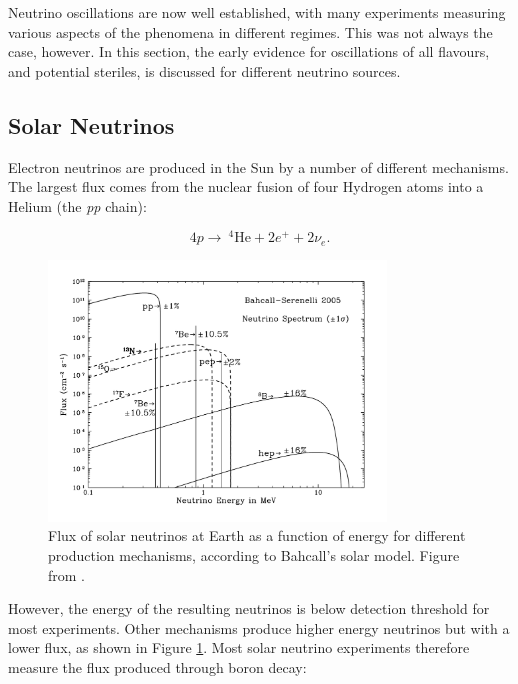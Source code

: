 Neutrino oscillations are now well established, with many experiments measuring various aspects of the phenomena in different regimes. This was not always the case, however. In this section, the early evidence for oscillations of all flavours, and potential steriles, is discussed for different neutrino sources.

\subsection{Solar Neutrinos}\label{sec:solarneutrinos}

Electron neutrinos are produced in the Sun by a number of different mechanisms. The largest flux comes from the nuclear fusion of four Hydrogen atoms into a Helium (the \textit{pp} chain):

\begin{equation}
4 p \rightarrow \medspace ^{4}\text{He} + 2e^{+} + 2\nu_e.
\end{equation}

\begin{figure}[!htbp]
\centering
\includegraphics*[width=0.8\textwidth,clip]{figs/bwbahcallserenellibs05OP.pdf}
\caption{Flux of solar neutrinos at Earth as a function of energy for different production mechanisms, according to Bahcall's solar model. Figure from \cite{behcallflux}.} \label{solarflux}
\end{figure}

However, the energy of the resulting neutrinos is below detection threshold for most experiments. Other mechanisms produce higher energy neutrinos but with a lower flux, as shown in Figure \ref{solarflux}. Most solar neutrino experiments therefore measure the flux produced through boron decay:

